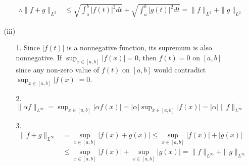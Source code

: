 \documentclass[letterpaper,12pt]{article}
\theoremstyle{definition}
\begin{document}
\begin{enumerate}
\begin{enumerate}
\begin{enumerate}
\begin{align*}
                  \therefore \|f+g\|_{L^2} &\leq \sqrt{\int_a^b|f(t)|^2dt} + \sqrt{\int_a^b|g(t)|^2dt} = \|f\|_{L^2} + \|g\|_{L^2}
                \end{align*}
              \end{enumerate}
            \item[(iii)]
              \begin{enumerate}
                \item[1.]
                Since $|f(t)|$ is a nonnegative function, its supremum is also nonnegative. If $\sup_{x\in[a,b]}|f(x)| = 0$, then $f(t)=0$ on $[a,b]$ since any non-zero value of $f(t)$ on $[a,b]$ would contradict $\sup_{x\in[a,b]}|f(x)| = 0$.
                \item[2.]
                $\|\alpha f\|_{L^\infty} = \sup_{x\in[a,b]}|\alpha f(x)| = |\alpha| \sup_{x\in[a,b]}|f(x)| = |\alpha|\|f\|_{L^\infty}$
                \item[3.]
                \begin{align*}
                  \|f+g\|_{L^\infty} &= \sup_{x\in[a,b]}|f(x) + g(x)| \leq \sup_{x\in[a,b]}|f(x)| + |g(x)| \\
                  & \leq \sup_{x\in[a,b]}|f(x)| + \sup_{x\in[a,b]}|g(x)| =\|f\|_{L^\infty} + \|g\|_{L^\infty}
                \end{align*}
              \end{enumerate}
          \end{enumerate}


\end{enumerate}
\end{document}
